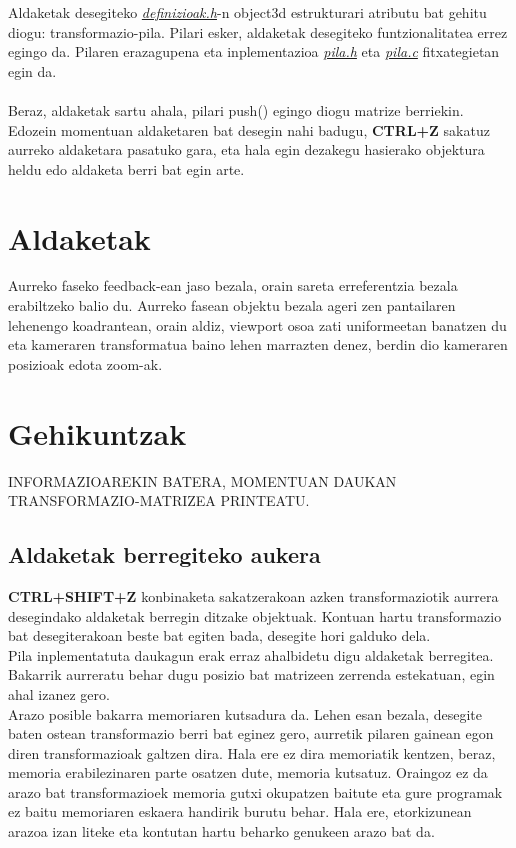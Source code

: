 \documentclass[12pt]{article}
\newcommand{\fitxategi}[1] {\underline{\textit{#1}}}
\newcommand{\tekla}[1] {\textbf{#1}}
\begin{document}
Aldaketak desegiteko \fitxategi{definizioak.h}-n object3d estrukturari atributu bat gehitu diogu: transformazio-pila. Pilari esker, aldaketak desegiteko funtzionalitatea errez egingo da.
Pilaren erazagupena eta inplementazioa \fitxategi{pila.h} eta \fitxategi{pila.c} fitxategietan egin da.\\\\
Beraz, aldaketak sartu ahala, pilari push() egingo diogu matrize berriekin. Edozein momentuan aldaketaren bat desegin nahi badugu, \tekla{CTRL+Z} sakatuz aurreko aldaketara pasatuko gara, eta hala egin dezakegu hasierako objektura heldu edo aldaketa berri bat egin arte.

\section{Aldaketak}

Aurreko faseko feedback-ean jaso bezala, orain sareta erreferentzia bezala erabiltzeko balio du. Aurreko fasean objektu bezala ageri zen pantailaren lehenengo koadrantean, orain aldiz, viewport\cite{viewport} osoa zati uniformeetan banatzen du eta kameraren transformatua baino lehen marrazten denez, berdin dio kameraren posizioak edota zoom-ak.


\section{Gehikuntzak}

INFORMAZIOAREKIN BATERA, MOMENTUAN DAUKAN TRANSFORMAZIO-MATRIZEA PRINTEATU.

\subsection{Aldaketak berregiteko aukera}

\tekla{CTRL+SHIFT+Z} konbinaketa sakatzerakoan azken transformaziotik aurrera desegindako aldaketak berregin ditzake objektuak. Kontuan hartu transformazio bat desegiterakoan beste bat egiten bada, desegite hori galduko dela.\\
Pila inplementatuta daukagun erak erraz ahalbidetu digu aldaketak berregitea. Bakarrik aurreratu behar dugu posizio bat matrizeen zerrenda estekatuan, egin ahal izanez gero.\\

Arazo posible bakarra memoriaren kutsadura da. Lehen esan bezala, desegite baten ostean transformazio berri bat eginez gero, aurretik pilaren gainean egon diren transformazioak galtzen dira. Hala ere ez dira memoriatik kentzen, beraz, memoria erabilezinaren parte osatzen dute, memoria kutsatuz. Oraingoz ez da arazo bat transformazioek memoria gutxi okupatzen baitute eta gure programak ez baitu memoriaren eskaera handirik burutu behar. Hala ere, etorkizunean arazoa izan liteke eta kontutan hartu beharko genukeen arazo bat da.
\end{document}
